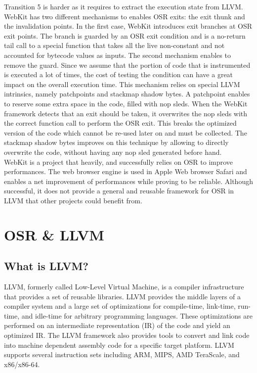 Transition 5 is harder as it requires to extract the execution state from LLVM.
WebKit has two different mechanisms to enables OSR exits: the exit thunk and the invalidation points.
In the first case, WebKit introduces exit branches at OSR exit points.
The branch is guarded by an OSR exit condition and is a no-return tail call to a special function that takes all the live non-constant and not accounted for bytecode values as inputs.
The second mechanism enables to remove the guard.
Since we assume that the portion of code that is instrumented is executed a lot of times, the cost of testing the condition can have a great impact on the overall execution time.
This mechanism relies on special LLVM intrinsics, namely patchpoints and stackmap shadow bytes.
A patchpoint enables to reserve some extra space in the code, filled with nop sleds. 
When the WebKit framework detects that an exit should be taken, it overwrites the nop sleds with the correct function call to perform the OSR exit.
This breaks the optimized version of the code which cannot be re-used later on and must be collected.
The stackmap shadow bytes improves on this technique by allowing to directly overwrite the code, without having any nop sled generated before hand.\\

WebKit is a project that heavily, and successfully relies on OSR to improve performances.
The web browser engine is used in Apple Web browser Safari and enables a net improvement of performances while proving to be reliable.
Although successful, it does not provide a general and reusable framework for OSR in LLVM that other projects could benefit from.\\

\section{OSR \& LLVM}\label{OSR&VM}
\subsection{What is LLVM?}
LLVM\cite{llvmUrl, lattner2004llvm}, formerly called Low-Level Virtual Machine, is a compiler infrastructure that provides a set of reusable libraries.
LLVM provides the middle layers of a compiler system and a large set of optimizations for compile-time, link-time, run-time, and idle-time for arbitrary programming languages.
These optimizations are performed on an intermediate representation (IR) of the code and yield an optimized IR.
The LLVM framework also provides tools to convert and link code into machine dependent assembly code for a specific target platform.
LLVM supports several instruction sets including ARM, MIPS, AMD TeraScale, and x86/x86-64\cite{llvmUrl}.\\

